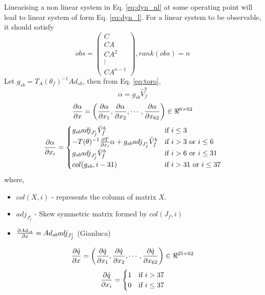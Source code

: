 Linearising a non linear system in Eq. \ref{eq:dyn_nl} at some operating point will lead to linear system of form Eq. \ref{eq:dyn_l}. For a linear system to be observable, it should satisfy
\begin{equation}
obs =
\begin{pmatrix}
C\\ CA \\ CA^{2}\\ \vdots \\ CA^{n-1}
\end{pmatrix}
, rank(obs) =n
\end{equation}
Let $g_{sb} = T_{A}(\theta_{f})^{-1}Ad_{sb}$, then from Eq. \ref{eq:toro},
$$\alpha = g_{sb} \hat{V}_{f}^{b}$$
\begin{equation}
\label{eq:dtoro_alpha}
\frac{\partial {\alpha}}{\partial {x}} = \left(\frac{\partial {\alpha}}{\partial {x_{1}}}, \frac{\partial {\alpha}}{\partial {x_{2}}}, \cdots , \frac{\partial {\alpha}}{\partial {x_{62}}}\right) \in \Re^{6 \times 62}
\end{equation}
\[
 \frac{\partial {\alpha}}{\partial {x_{i}}} = 
  \begin{cases}
   g_{sb}adj_{J_{f}^{i}} \hat{V}_{f}^{b} & \text{if } i \leq 3 \\
  -T(\theta)^{-1}\frac{\partial {T}}{\partial {x_{i}}}\alpha + g_{sb} adj_{J_{f}^{i}} \hat{V}_{f}^{b} & \text{if } i > 3 \text{ or } i \leq 6 \\
   g_{sb} adj_{J_{f}^{i}} \hat{V}_{f}^{b} & \text{if } i > 6 \text{ or } i \leq 31 \\
   col(g_{sb},i-31) & \text{if } i > 31 \text{ or } i \leq 37 \\
  \end{cases}
\]
where,
\begin{itemize}
\item $col(X,i)$ - represents the column of matrix $X$.
\item $adj_{J_{f}^{i}}$ - Skew symmetric matrix formed by $col(J_{f},i)$
\item $\frac{\partial {Ad_{sb}}}{\partial {x}} = Ad_{sb} adj_{J_{f}^{i}} $ (Gianluca)
\end{itemize}
\begin{equation}
\label{eq:dtoro_dq}
\frac{\partial {\dot{q}}}{\partial {x}} = \left(\frac{\partial {\dot{q}}}{\partial {x_{1}}}, \frac{\partial {\dot{q}}}{\partial {x_{2}}}, \cdots , \frac{\partial {\dot{q}}}{\partial {x_{62}}}\right) \in \Re^{25 \times 62}
\end{equation}
\[
\frac{\partial {\dot{q}}}{\partial {x_{i}}} = 
	\begin{cases}
	1 & \text{if } i > 37 \\
	0 & \text{if } i \le 37  \\
	\end{cases}
\]
